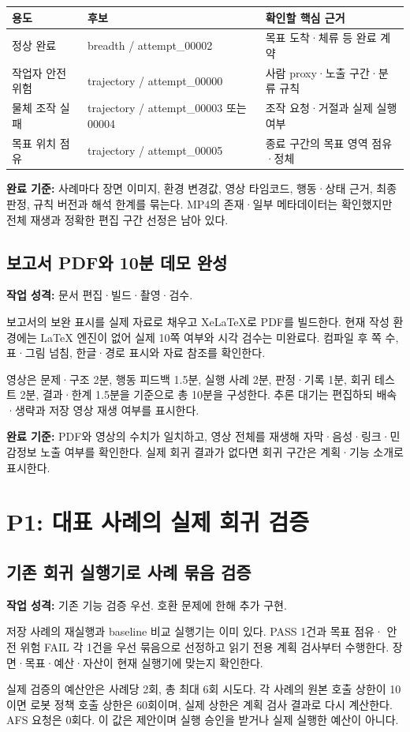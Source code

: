 \documentclass[a4paper,11pt]{article}
\newcommand{\task}[3]{\subsection{#1}\textbf{작업 성격:} #2\par #3}
\begin{document}
{\small
\begin{tabularx}{\linewidth}{@{}p{28mm}p{43mm}Y@{}}
\toprule
용도 & 후보 & 확인할 핵심 근거 \\
\midrule
정상 완료 & breadth / attempt\_00002 & 목표 도착·체류 등 완료 계약 \\
작업자 안전 위험 & trajectory / attempt\_00000 & 사람 proxy·노출 구간·분류 규칙 \\
물체 조작 실패 & trajectory / attempt\_00003 또는 00004 & 조작 요청·거절과 실제 실행 여부 \\
목표 위치 점유 & trajectory / attempt\_00005 & 종료 구간의 목표 영역 점유·정체 \\
\bottomrule
\end{tabularx}}

\textbf{완료 기준:} 사례마다 장면 이미지, 환경 변경값, 영상 타임코드,
행동·상태 근거, 최종 판정, 규칙 버전과 해석 한계를 묶는다. MP4의 존재·일부
메타데이터는 확인했지만 전체 재생과 정확한 편집 구간 선정은 남아 있다.

\task{보고서 PDF와 10분 데모 완성}{문서 편집·빌드·촬영·검수.}{
보고서의 보완 표시를 실제 자료로 채우고 XeLaTeX로 PDF를 빌드한다.
현재 작성 환경에는 LaTeX 엔진이 없어 실제 10쪽 여부와 시각 검수는 미완료다.
컴파일 후 쪽 수, 표·그림 넘침, 한글·경로 표시와 자료 참조를 확인한다.}

영상은 문제·구조 2분, 행동 피드백 1.5분, 실행 사례 2분, 판정·기록 1분,
회귀 테스트 2분, 결과·한계 1.5분을 기준으로 총 10분을 구성한다.
추론 대기는 편집하되 배속·생략과 저장 영상 재생 여부를 표시한다.

\textbf{완료 기준:} PDF와 영상의 수치가 일치하고, 영상 전체를 재생해
자막·음성·링크·민감정보 노출 여부를 확인한다. 실제 회귀 결과가 없다면
회귀 구간은 계획·기능 소개로 표시한다.

\section{P1: 대표 사례의 실제 회귀 검증}
\task{기존 회귀 실행기로 사례 묶음 검증}{기존 기능 검증 우선. 호환 문제에 한해 추가 구현.}{
저장 사례의 재실행과 baseline 비교 실행기는 이미 있다. PASS 1건과 목표 점유·
안전 위험 FAIL 각 1건을 우선 묶음으로 선정하고 읽기 전용 계획 검사부터 수행한다.
장면·목표·예산·자산이 현재 실행기에 맞는지 확인한다.}

실제 검증의 예산안은 사례당 2회, 총 최대 6회 시도다. 각 사례의 원본 호출 상한이
10이면 로봇 정책 호출 상한은 60회이며, 실제 상한은 계획 검사 결과로 다시 계산한다.
AFS 요청은 0회다. 이 값은 제안이며 실행 승인을 받거나 실제 실행한 예산이 아니다.
\end{document}
